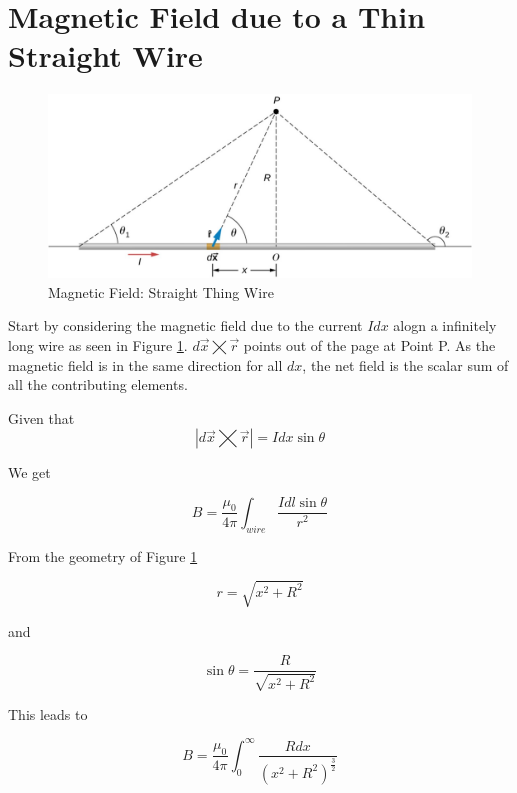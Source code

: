 \documentclass[14pt]{memoir}
\begin{document}
\section{Magnetic Field due to a Thin Straight Wire}

\begin{figure}[H]
\begin{center}
\includegraphics[scale=0.50]{fig/fig_12_05.jpg}
\caption{Magnetic Field: Straight Thing Wire}
\label{fig:12_05}
\end{center}
\end{figure}

Start by considering the magnetic field due to the current $I dx$ alogn a infinitely long wire as seen in Figure \ref{fig:12_05}.  $d\vec{x} \bigtimes \vec{r}$ points out of the page at Point P. As the magnetic field is in the same direction for all $dx$, the net field is the scalar sum of all the contributing elements. 

Given that 
\begin{equation}
|d\vec{x} \bigtimes \vec{r}| = I dx \sin{\theta}
\end{equation}

We get

\begin{equation}
B = \frac{\mu_0}{4\pi} \int_{wire} \frac{I dl \sin{\theta}}{r^2}
\end{equation}

From the geometry of Figure \ref{fig:12_05}

\begin{equation}
r = \sqrt{x^2 + R^2}
\end{equation}

and

\begin{equation}
\sin{\theta} = \frac{R}{\sqrt{x^2 + R^2}}
\end{equation}

This leads to

\begin{equation}
B = \frac{\mu_0}{4\pi} \int_{0}^{\infty} \frac{Rdx}{(x^2 + R^2)^\frac{3}{2}}
\end{equation}
\end{document}
